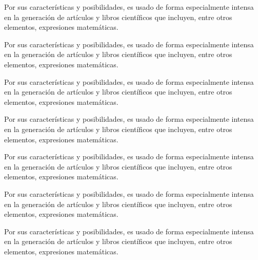 \documentclass{book}
\begin{document}
\begin{multicols}{2}
  Por sus características y posibilidades, es usado de forma especialmente intensa en la generación de artículos y libros científicos que incluyen, entre otros elementos, expresiones matemáticas.
\end{multicols}

\begin{multicols}{3}
  Por sus características y posibilidades, es usado de forma especialmente intensa en la generación de artículos y libros científicos que incluyen, entre otros elementos, expresiones matemáticas.
\end{multicols}

\begin{minipage}[b]{4cm}
  Por sus características y posibilidades, es usado de forma especialmente intensa en la generación de artículos y libros científicos que incluyen, entre otros elementos, expresiones matemáticas.
\end{minipage}

\vspace{2cm}

\begin{minipage}[b]{0.45\textwidth}
  Por sus características y posibilidades, es usado de forma especialmente intensa en la generación de artículos y libros científicos que incluyen, entre otros elementos, expresiones matemáticas.
\end{minipage} \hfill 
\begin{minipage}[b]{0.45\textwidth}
  Por sus características y posibilidades, es usado de forma especialmente intensa en la generación de artículos y libros científicos que incluyen, entre otros elementos, expresiones matemáticas.
\end{minipage}

\vspace{2cm}

\parbox{0.45\textwidth}{
  Por sus características y posibilidades, es usado de forma especialmente intensa en la generación de artículos y libros científicos que incluyen, entre otros elementos, expresiones matemáticas.
}
\parbox{0.45\textwidth}{
  Por sus características y posibilidades, es usado de forma especialmente intensa en la generación de artículos y libros científicos que incluyen, entre otros elementos, expresiones matemáticas.
}
\end{document}
